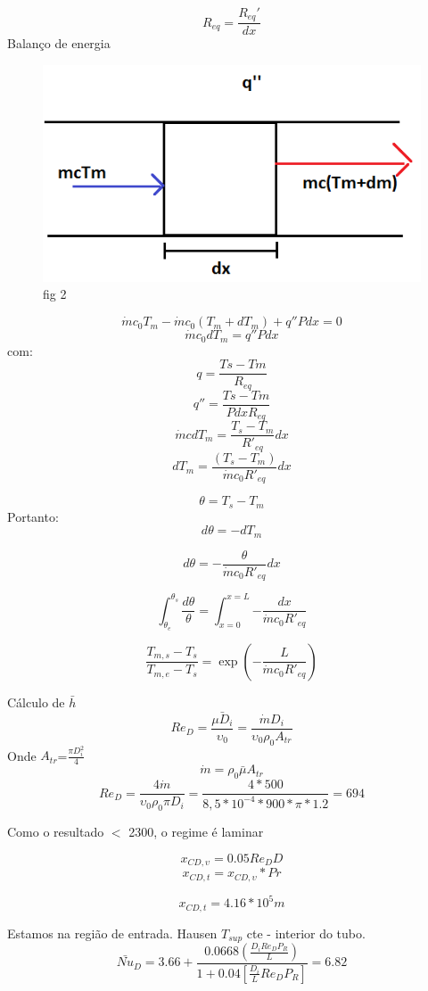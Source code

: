 \documentclass[a4paper, 12pt]{article}
\begin{document}
\[R_{eq}=\frac{R_{eq}'}{dx}\]
Balanço de energia
\begin{figure}[h]
\begin{center}
\includegraphics[scale=0.48]{./fig/2.png}
\caption{\label{fig:1}fig 2} 
\end{center}
\end{figure}

\[\dot{m}c_{0}T_{m}-\dot{m}c_{0}(T_{m}+dT_{m})+q''Pdx=0\]
\[\dot{m}c_{0}dT_{m}=q''Pdx\]
com:
\[q=\frac{Ts-Tm}{R_{eq}}\]
\[q''=\frac{Ts-Tm}{PdxR_{eq}}\]
\[\dot{m}cdT_{m}=\frac{T_{s}-T_{m}}{R'_{eq}}dx\]
\[dT_{m}=\frac{(T_{s}-T_{m})}{\dot{m}c_{0}R'_{eq}}dx\]

\[\theta = T_{s}-T_{m}\]
Portanto:
\[d\theta = -dT_{m}\]

\[d\theta = -\frac{\theta}{\dot{m}c_{0}R'_{eq}}dx\]

\[\int_{\theta _{e}}^{\theta _{s}}{\frac{d\theta}{\theta}}=\int_{x=0}^{x=L}{-\frac{dx}{\dot{m}c_{0}R'_{eq}}}\]

\begin{equation}
\frac{T_{m,s}-T_{s}}{T_{m,e}-T_{s}}=\exp(-\frac{L}{\dot{m}c_{0}R'_{eq}})
\label{eq:1}
\end{equation}


Cálculo de $\bar{h} $
\[
Re_{D}=\frac{\bar{\mu D_{i}}}{\upsilon _{0}}=\frac{\dot{m} D_{i}}{\upsilon _{0}\rho _{0} A_{tr}}\]
Onde $A_{tr}$=$\frac{\pi D_{i}^{2}}{4}$
\[\dot{m}=\rho _{0} \bar{\mu } A_{tr}\]
\[Re_{D}=\frac{4\dot{m}}{\upsilon _{0} \rho _{0} \pi D_{i}}=\frac{4*500}{8,5*10^{-4}*900*\pi * 1.2}=694\]

Como o resultado $<$ 2300, o regime é laminar

\[x_{CD,\upsilon}=0.05Re_{D}D\]
\[x_{CD,t}=x_{CD,\upsilon}*Pr\]

\[x_{CD,t}=4.16*10^{5}m\]

Estamos na região de entrada. Hausen $T_{sup}$ cte - interior do tubo.
\[\bar{Nu}_{D}=3.66+\frac{0.0668(\frac{D_{i}Re_{D}P_{R}}{L})}{1+0.04[\frac{D_{i}}{L}Re_{D}P_{R}]}=6.82\]
\end{document}
